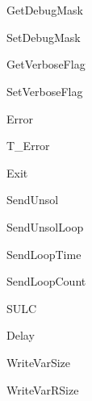 \section{}

\begin{procdesc}{GetDebugMask}{}
\end{procdesc}

\begin{procdesc}{SetDebugMask}{}
\end{procdesc}

\begin{procdesc}{GetVerboseFlag}{}
\end{procdesc}

\begin{procdesc}{SetVerboseFlag}{}
\end{procdesc}

\begin{procdesc}{Error}{}
\end{procdesc}

\begin{procdesc}{T\_Error}{}
\end{procdesc}

\begin{procdesc}{Exit}{}
\end{procdesc}

\begin{procdesc}{SendUnsol}{}
\end{procdesc}

\begin{procdesc}{SendUnsolLoop}{}
\end{procdesc}

\begin{procdesc}{SendLoopTime}{}
\end{procdesc}

\begin{procdesc}{SendLoopCount}{}
\end{procdesc}

\begin{procdesc}{SULC}{}
\end{procdesc}

\begin{procdesc}{Delay}{}
\end{procdesc}

\begin{procdesc}{WriteVarSize}{}
\end{procdesc}

\begin{procdesc}{WriteVarRSize}{}
\end{procdesc}


